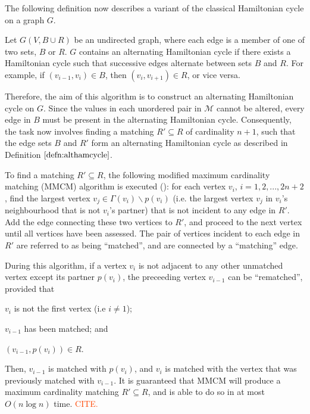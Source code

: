 \documentclass[oribibl]{llncs}
\begin{document}
The following definition now describes a variant of the classical Hamiltonian cycle on a graph $G$.

\begin{definition}
	\label{defn:althamcycle}
	Let $G(V, B\cup R)$ be an undirected graph, where each edge is a member of one of two sets, $B$ or $R$. $G$ contains an alternating Hamiltonian cycle if there exists a Hamiltonian cycle such that successive edges alternate between sets $B$ and $R$. For example, if $(v_{i-1}, v_i) \in B$, then $(v_i, v_{i+1}) \in R$, or vice versa.
\end{definition}



Therefore, the aim of this algorithm is to construct an alternating Hamiltonian cycle on $G$. Since the values in each unordered pair in $\mathcal{M}$ cannot be altered, every edge in $B$ must be present in the alternating Hamiltonian cycle. Consequently, the task now involves finding a matching $R' \subseteq R$ of cardinality $n+1$, such that the edge sets $B$ and $R'$ form an alternating Hamiltonian cycle as described in Definition $\ref{defn:althamcycle}$.  


To find a matching $R' \subseteq R$, the following modified maximum cardinality matching (MMCM) algorithm is executed (\citealp{mahadev1994, becker2010}): for each vertex $v_i$, $i = 1, 2,...,2n+2$, find the largest vertex $v_j \in \Gamma(v_i)\backslash p(v_i)$ (i.e. the largest vertex $v_j$ in $v_i$'s neighbourhood that is not $v_i$'s partner) that is not incident to any edge in $R'$. Add the edge connecting these two vertices to $R'$, and proceed to the next vertex until all vertices have been assessed. The pair of vertices incident to each edge in $R'$ are referred to as being ``matched'', and are connected by a ``matching'' edge. 

During this algorithm, if a vertex $v_i$ is not adjacent to any other unmatched vertex except its partner $p(v_i)$, the preceeding vertex $v_{i-1}$ can be ``rematched'', provided that 
\begin{enumerate*}[label={(\alph*)}]
	\item $v_i$ is not the first vertex (i.e $i \neq 1$); 
	\item $v_{i-1}$ has been matched; and
	\item $(v_{i-1}, p(v_i)) \in R$.
\end{enumerate*}
Then, $v_{i-1}$ is matched with $p(v_i)$, and $v_i$ is matched with the vertex that was previously matched with $v_{i-1}$. It is guaranteed that MMCM will produce a maximum cardinality matching $R' \subseteq R$, and is able to do so in at most $O(n \log n)$ time. \textcolor{OrangeRed}{CITE.}
\end{document}
